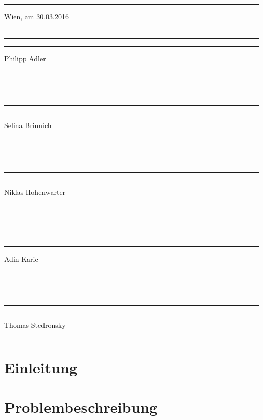 \documentclass[12pt]{article}
\begin{document}
\rule[-0.2cm]{1cm}{0pt} Wien, am 30.03.2016 \\ \\

\hfill \hfill \rule[-0.2cm]{6cm}{0.5pt} \rule[-0.2cm]{2cm}{0pt}

\hfill \hfill Philipp Adler \rule[-0.2cm]{5.5cm}{0pt}\\ \\

\hfill \hfill \rule[-0.2cm]{6cm}{0.5pt} \rule[-0.2cm]{2cm}{0pt}

\hfill \hfill Selina Brinnich \rule[-0.2cm]{5.2cm}{0pt}\\ \\

\hfill \hfill \rule[-0.2cm]{6cm}{0.5pt} \rule[-0.2cm]{2cm}{0pt}

\hfill \hfill Niklas Hohenwarter \rule[-0.2cm]{4.4cm}{0pt}\\ \\

\hfill \hfill \rule[-0.2cm]{6cm}{0.5pt} \rule[-0.2cm]{2cm}{0pt}

\hfill \hfill Adin Karic \rule[-0.2cm]{6.0cm}{0pt}\\ \\

\hfill \hfill \rule[-0.2cm]{6cm}{0.5pt} \rule[-0.2cm]{2cm}{0pt}

\hfill \hfill Thomas Stedronsky \rule[-0.2cm]{4.4cm}{0pt}

\newpage
\vspace*{\fill} 

\label{gender}
\vspace*{\fill} 
\newpage


\newpage

\label{pageRomanEnd}


\newpage %

\ofoot{\pagemark}

\section{Einleitung}
\label{sec:einleitung}


\section{Problembeschreibung}
\label{sec:problembeschreibung}
\end{document}
